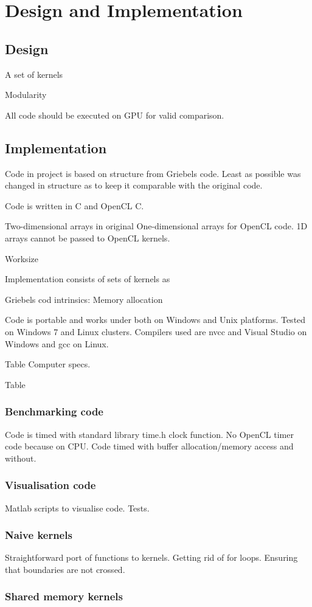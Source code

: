 \chapter{Design and Implementation}

\section{Design}

A set of kernels

Modularity

All code should be executed on GPU for valid comparison. 

\section{Implementation}
Code in project is based on structure from Griebels code. Least as possible was changed in structure as to keep it comparable with the original code.

Code is written in C and OpenCL C.

Two-dimensional arrays in original 
One-dimensional arrays for OpenCL code. 1D arrays cannot be passed to OpenCL kernels.

Worksize

Implementation consists of sets of kernels as 

Griebels cod intrinsics: Memory allocation

Code is portable and works under both on Windows and Unix platforms. Tested on Windows 7 and Linux clusters. Compilers used are nvcc and Visual Studio on Windows and gcc on Linux.

Table Computer specs.


Table

\subsection{Benchmarking code}
Code is timed with standard library time.h clock function.
No OpenCL timer code because on CPU. Code timed with buffer allocation/memory access and without.

\subsection{Visualisation code}
Matlab scripts to visualise code. Tests.

\subsection{Naive kernels}
Straightforward port of functions to kernels. Getting rid of for loops. Ensuring that boundaries are not crossed.


\subsection{Shared memory kernels}